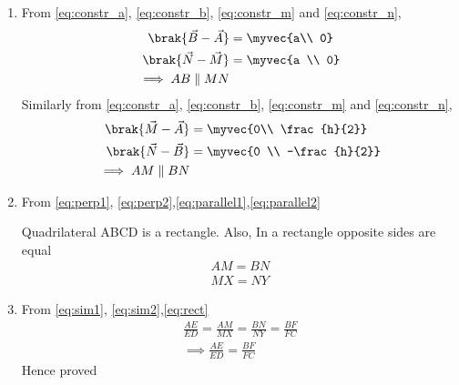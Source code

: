 \begin{enumerate}[label=\thesection.\arabic*.,ref=\thesection.\theenumi]
\item From \eqref{eq:constr_a}, \eqref{eq:constr_b}, \eqref{eq:constr_m} and \eqref{eq:constr_n},
\begin{align}
\brak{\vec{B}-\vec{A}} &= \myvec{a\\ 0}
\\
\brak{\vec{N}-\vec{M}} &= \myvec{a \\ 0}
\\
\implies AB \parallel MN
\label{eq:parallel1}
\end{align}
%
Similarly from \eqref{eq:constr_a}, \eqref{eq:constr_b}, \eqref{eq:constr_m} and \eqref{eq:constr_n},
\begin{align}
\brak{\vec{M}-\vec{A}} &= \myvec{0\\ \frac{h}{2}}
\\
\brak{\vec{N}-\vec{B}} &= \myvec{0 \\ -\frac{h}{2}}
\\
\implies AM \parallel BN
\label{eq:parallel2}
\end{align}
%

\item From \eqref{eq:perp1}, \eqref{eq:perp2},\eqref{eq:parallel1},\eqref{eq:parallel2}

Quadrilateral ABCD is a rectangle. Also, In a rectangle opposite sides are equal
\begin{align}
AM = BN
\\
MX = NY
\label{eq:rect}
\end{align}

\item From \eqref{eq:sim1}, \eqref{eq:sim2},\eqref{eq:rect}
\begin{align}
\frac {AE} {ED} = \frac {AM} {MX} = \frac {BN} {NY}  = \frac {BF} {FC}
\\
\implies 
\frac {AE} {ED} = \frac {BF}{FC}
\label{eq:soln}
\end{align}
Hence proved
\end{enumerate}
